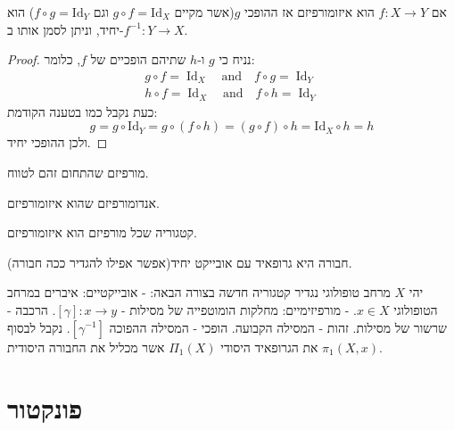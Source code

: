 \documentclass{tstextbook}
\begin{document}
\begin{proposition}
אם \(f:X\to Y\) הוא איזומורפיזם אז ההופכי \(g\)(אשר מקיים \(g\circ f = \mathrm{Id}_{X}\) וגם \(f\circ g=\mathrm{Id}_{Y}\)) הוא יחיד, וניתן לסמן אותו ב-\(f^{-1}:Y\to X\).

\end{proposition}
\begin{proof}
נניח כי \(g\) ו-\(h\) שתיהם הופכיים של \(f\), כלומר:
\begin{gather*}g\circ f=\operatorname{Id}_{X}\quad{\mathrm{and}}\quad f\circ g=\operatorname{Id}_{Y} \\h\circ f=\operatorname{Id}_{X}\quad{\mathrm{and}}\quad f\circ h=\operatorname{Id}_{Y}
\end{gather*}
כעת נקבל כמו בטענה הקודמת:
$$g=g\circ{\mathrm{Id}}_{Y}=g\circ(f\circ h)=(g\circ f)\circ h={\mathrm{Id}}_{X}\circ h=h$$
ולכן ההופכי יחיד.

\end{proof}
\begin{definition}[אנדומורפיזם]
מורפיזם שהתחום זהם לטווח.

\end{definition}
\begin{definition}[אוטומורפיזם]
אנדומורפיזם שהוא איזומורפיזם.

\end{definition}
\begin{definition}[גרופויד]
קטגוריה שכל מורפיזם הוא איזומורפיזם.

\end{definition}
\begin{example}
חבורה היא גרופאיד עם אובייקט יחיד(אפשר אפילו להגדיר ככה חבורה).

\end{example}
\begin{example}
יהי \(X\) מרחב טופולוגי נגדיר קטגוריה חדשה בצורה הבאה:
- אובייקטיים: איברים במרחב הטופולוגי \(x \in X\).
- מורפיזימיים: מחלקות הומוטפייה של מסילות - \(\left[ \gamma \right]:x\to y\).
הרכבה - שרשור של מסילות.
זהות - המסילה הקבועה.
הופכי - המסילה ההפוכה \(\left[ \gamma ^{-1} \right]\).
נקבל לבסוף את הגרופאיד היסודי \(\Pi_{1}(X)\) אשר מכליל את החבורה היסודית \(\pi_{1}(X,x)\).

\end{example}
\section{פונקטור}
\end{document}
